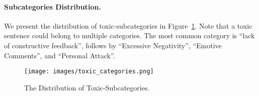 \paragraph{Subcategories Distribution.}
We present the distribution of  toxic-subcategories in Figure~\ref{fig:toxic_categories}.
Note that a toxic sentence could belong to multiple categories. 
The most common category is ``lack of constructive feedback'', follows by ``Excessive Negativity'', ``Emotive Comments'', and ``Personal Attack''. 

\begin{figure}[h]
    \centering
    \texttt{[image: images/toxic\_categories.png]}
    \caption{The Distribution of  Toxic-Subcategories.}
    \label{fig:toxic_categories}
\end{figure}







